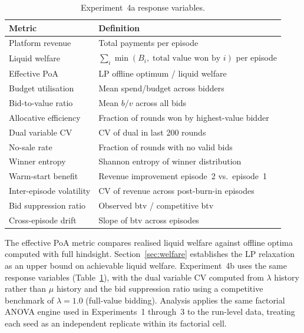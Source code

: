 \begin{table}[H]
\centering
\small
\caption{Experiment~4a response variables.}
\label{tab:exp4a_responses}
\begin{tabular}{ll}
\toprule
\textbf{Metric} & \textbf{Definition} \\
\midrule
Platform revenue       & Total payments per episode \\
Liquid welfare         & $\sum_i \min(B_i,\; \text{total value won by } i)$ per episode \\
Effective PoA          & LP offline optimum / liquid welfare \\
Budget utilisation     & Mean spend/budget across bidders \\
Bid-to-value ratio     & Mean $b/v$ across all bids \\
Allocative efficiency  & Fraction of rounds won by highest-value bidder \\
Dual variable CV       & CV of dual in last 200 rounds \\
No-sale rate           & Fraction of rounds with no valid bids \\
Winner entropy         & Shannon entropy of winner distribution \\
Warm-start benefit     & Revenue improvement episode~2 vs.~episode~1 \\
Inter-episode volatility & CV of revenue across post-burn-in episodes \\
Bid suppression ratio  & Observed btv / competitive btv \\
Cross-episode drift    & Slope of btv across episodes \\
\bottomrule
\end{tabular}
\end{table}

The effective PoA metric compares realised liquid welfare against offline optima computed with full hindsight. Section~\ref{sec:welfare} establishes the LP relaxation as an upper bound on achievable liquid welfare. Experiment~4b uses the same response variables (Table~\ref{tab:exp4a_responses}), with the dual variable CV computed from $\lambda$ history rather than $\mu$ history and the bid suppression ratio using a competitive benchmark of $\lambda = 1.0$ (full-value bidding). Analysis applies the same factorial ANOVA engine used in Experiments~1 through~3 to the run-level data, treating each seed as an independent replicate within its factorial cell.
